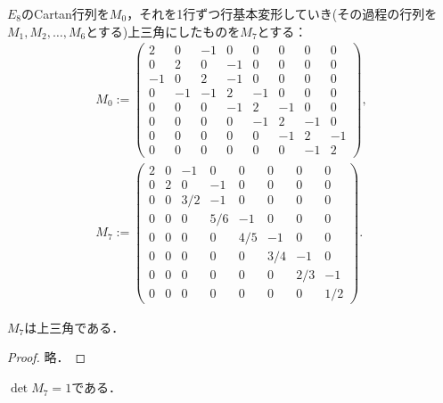 \begin{definition}
  \label{defi:M0-M7}
  \leanok
  $E_8$のCartan行列を$M_0$，それを1行ずつ行基本変形していき(その過程の行列を$M_1, M_2, \ldots, M_6$とする)上三角にしたものを$M_7$とする：
  \begin{gather}
    M_0 :=
    \begin{pmatrix}
      2 & 0 & -1 & 0 & 0 & 0 & 0 & 0 \\
      0 & 2 & 0 & -1 & 0 & 0 & 0 & 0 \\
      -1 & 0 & 2 & -1 & 0 & 0 & 0 & 0 \\
      0 & -1 & -1 & 2 & -1 & 0 & 0 & 0 \\
      0 & 0 & 0 & -1 & 2 & -1 & 0 & 0 \\
      0 & 0 & 0 & 0 & -1 & 2 & -1 & 0 \\
      0 & 0 & 0 & 0 & 0 & -1 & 2 & -1 \\
      0 & 0 & 0 & 0 & 0 & 0 & -1 & 2
    \end{pmatrix},\\
    M_7 :=
    \begin{pmatrix}
      2 & 0 & -1 & 0 & 0 & 0 & 0 & 0 \\
      0 & 2 & 0 & -1 & 0 & 0 & 0 & 0 \\
      0 & 0 & 3/2 & -1 & 0 & 0 & 0 & 0 \\
      0 & 0 & 0 & 5/6 & -1 & 0 & 0 & 0 \\
      0 & 0 & 0 & 0 & 4/5 & -1 & 0 & 0 \\
      0 & 0 & 0 & 0 & 0 & 3/4 & -1 & 0 \\
      0 & 0 & 0 & 0 & 0 & 0 & 2/3 & -1 \\
      0 & 0 & 0 & 0 & 0 & 0 & 0 & 1/2
    \end{pmatrix}.
  \end{gather}
\end{definition}

\begin{lemma}
  \label{lem:M7_upperTrianglar}
  \leanok
  $M_7$は上三角である．
\end{lemma}

\begin{proof}
  \leanok
  略．
\end{proof}

\begin{lemma}
  \label{lem:M7_det}
  \leanok
  $\det M_7 = 1$である．
\end{lemma}

